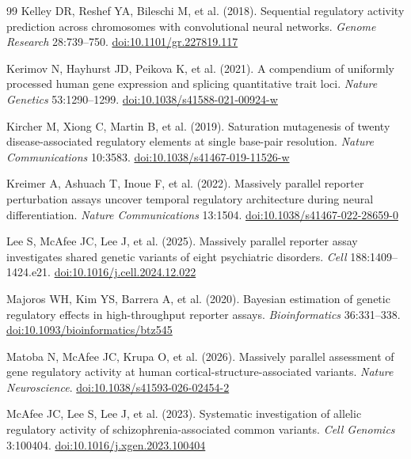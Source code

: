 \begin{thebibliography}{99}
 Kelley DR, Reshef YA, Bileschi M, et al. (2018). Sequential regulatory activity prediction across chromosomes with convolutional neural networks. \textit{Genome Research} 28:739–750. \href{https://doi.org/10.1101/gr.227819.117}{doi:10.1101/gr.227819.117}

 Kerimov N, Hayhurst JD, Peikova K, et al. (2021). A compendium of uniformly processed human gene expression and splicing quantitative trait loci. \textit{Nature Genetics} 53:1290–1299. \href{https://doi.org/10.1038/s41588-021-00924-w}{doi:10.1038/s41588-021-00924-w}

 Kircher M, Xiong C, Martin B, et al. (2019). Saturation mutagenesis of twenty disease-associated regulatory elements at single base-pair resolution. \textit{Nature Communications} 10:3583. \href{https://doi.org/10.1038/s41467-019-11526-w}{doi:10.1038/s41467-019-11526-w}

 Kreimer A, Ashuach T, Inoue F, et al. (2022). Massively parallel reporter perturbation assays uncover temporal regulatory architecture during neural differentiation. \textit{Nature Communications} 13:1504. \href{https://doi.org/10.1038/s41467-022-28659-0}{doi:10.1038/s41467-022-28659-0}

 Lee S, McAfee JC, Lee J, et al. (2025). Massively parallel reporter assay investigates shared genetic variants of eight psychiatric disorders. \textit{Cell} 188:1409–1424.e21. \href{https://doi.org/10.1016/j.cell.2024.12.022}{doi:10.1016/j.cell.2024.12.022}

 Majoros WH, Kim YS, Barrera A, et al. (2020). Bayesian estimation of genetic regulatory effects in high-throughput reporter assays. \textit{Bioinformatics} 36:331–338. \href{https://doi.org/10.1093/bioinformatics/btz545}{doi:10.1093/bioinformatics/btz545}

 Matoba N, McAfee JC, Krupa O, et al. (2026). Massively parallel assessment of gene regulatory activity at human cortical-structure-associated variants. \textit{Nature Neuroscience}. \href{https://doi.org/10.1038/s41593-026-02454-2}{doi:10.1038/s41593-026-02454-2}

 McAfee JC, Lee S, Lee J, et al. (2023). Systematic investigation of allelic regulatory activity of schizophrenia-associated common variants. \textit{Cell Genomics} 3:100404. \href{https://doi.org/10.1016/j.xgen.2023.100404}{doi:10.1016/j.xgen.2023.100404}


\end{thebibliography}
